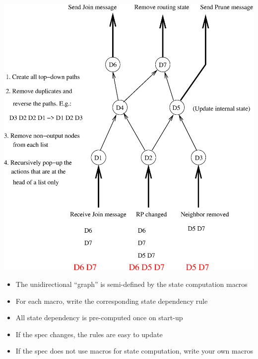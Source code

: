 \documentclass[landscape]{icsislides}
\begin{document}
\begin{slide}

\begin{center}
  \includegraphics[scale=0.6]{figs/pim_state_dependency5}
\end{center}

\end{slide}

\begin{slide}

\begin{itemize}
  \item The unidirectional ``graph'' is semi-defined by the state computation
  macros

  \item For each macro, write the corresponding state dependency rule

  \item All state dependency is pre-computed once on start-up

  \item If the spec changes, the rules are easy to update

  \item If the spec does not use macros for state computation, write your own
  macros

\end{itemize}

\end{slide}
\end{document}
